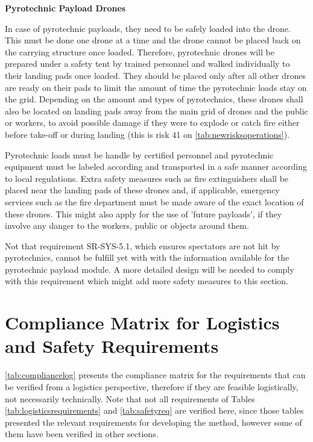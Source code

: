 \textbf{Pyrotechnic Payload Drones}

In case of pyrotechnic payloads, they need to be safely loaded into the drone. This must be done one drone at a time and the drone cannot be placed back on the carrying structure once loaded. Therefore, pyrotechnic drones will be prepared under a safety tent by trained personnel and walked individually to their landing pads once loaded. They should be placed only after all other drones are ready on their pads to limit the amount of time the pyrotechnic loads stay on the grid. Depending on the amount and types of pyrotechnics, these drones shall also be located on landing pads away from the main grid of drones and the public or workers, to avoid possible damage if they were to explode or catch fire either before take-off or during landing (this is risk 41 on \autoref{tab:newrisksoperations}). 

Pyrotechnic loads must be handle by certified personnel and pyrotechnic equipment must be labeled according and transported in a safe manner according to local regulations. Extra safety measures such as fire extinguishers shall be placed near the landing pads of these drones and, if applicable, emergency services such as the fire department must be made aware of the exact location of these drones. This might also apply for the use of 'future payloads', if they involve any danger to the workers, public or objects around them.

Not that requirement SR-SYS-5.1, which ensures spectators are not hit by pyrotechnics, cannot be fulfill yet with with the information available for the pyrotechnic payload module. A more detailed design will be needed to comply with this requirement which might add more safety measures to this section.

\section{Compliance Matrix for Logistics and Safety Requirements}

\autoref{tab:compliancelog} presents the compliance matrix for the requirements that can be verified from a logistics perspective, therefore if they are feasible logistically, not necessarily technically. Note that not all requirements of Tables \autoref{tab:logisticsrequirements} and \autoref{tab:safetyreq} are verified here, since those tables presented the relevant requirements for developing the method, however some of them have been verified in other sections. 

